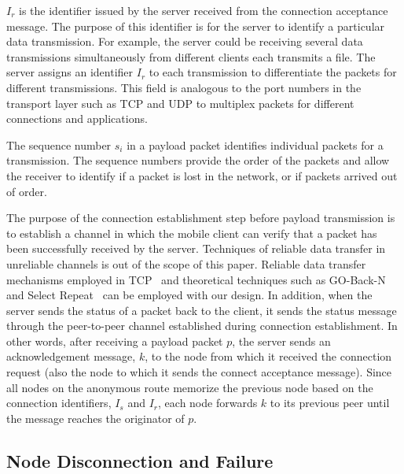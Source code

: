 $I_r$ is the identifier issued by the server received from the
connection acceptance message. The purpose of this identifier is
for the server to identify a particular data transmission. For
example, the server could be receiving several data transmissions
simultaneously from different clients each transmits a file. The
server assigns an identifier $I_r$ to each transmission to
differentiate the packets for different transmissions. This field
is analogous to the port numbers in the transport layer such as
TCP and UDP to multiplex packets for different connections and
applications.

The sequence number $s_i$ in a payload packet identifies
individual packets for a transmission. The sequence numbers
provide the order of the packets and allow the receiver to
identify if a packet is lost in the network, or if packets arrived
out of order.

The purpose of the connection establishment step before payload
transmission is to establish a channel in which the mobile client
can verify that a packet has been successfully received by the
server. Techniques of reliable data transfer in unreliable
channels is out of the scope of this paper. Reliable data transfer
mechanisms employed in TCP~\cite{RFC793} and theoretical
techniques such as GO-Back-N and Select Repeat~\cite{book:Kurose}
can be employed with our design. In addition, when the server
sends the status of a packet back to the client, it sends the
status message through the peer-to-peer channel established during
connection establishment. In other words, after receiving a
payload packet $p$, the server sends an acknowledgement message,
$k$, to the node from which it received the connection request
(also the node to which it sends the connect acceptance message).
Since all nodes on the anonymous route memorize the previous node
based on the connection identifiers, $I_s$ and $I_r$, each node
forwards $k$ to its previous peer until the message reaches the
originator of $p$.


\subsection{Node Disconnection and Failure}

